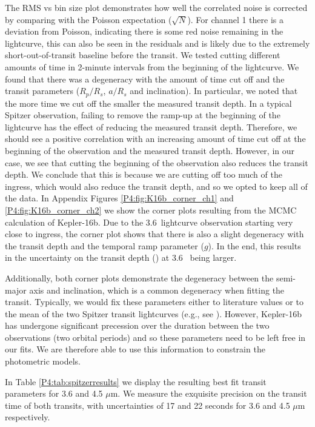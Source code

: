 The RMS vs bin size plot demonstrates how well the correlated noise is corrected by comparing with the Poisson expectation ($\sqrt{N}$). For channel 1 there is a deviation from Poisson, indicating there is some red noise remaining in the lightcurve, this can also be seen in the residuals and is likely due to the extremely short-out-of-transit baseline before the transit. We tested cutting different amounts of time in 2-minute intervals from the beginning of the lightcurve. We found that there was a degeneracy with the amount of time cut off and the transit parameters ($R_p/R_s$, $a/R_s$ and inclination). In particular, we noted that the more time we cut off the smaller the measured transit depth. In a typical Spitzer observation, failing to remove the ramp-up at the beginning of the lightcurve has the effect of reducing the measured transit depth. Therefore, we should see a positive correlation with an increasing amount of time cut off at the beginning of the observation and the measured transit depth. However, in our case, we see that cutting the beginning of the observation also reduces the transit depth. We conclude that this is because we are cutting off too much of the ingress, which would also reduce the transit depth, and so we opted to keep all of the data. In Appendix Figures \ref{P4:fig:K16b_corner_ch1} and \ref{P4:fig:K16b_corner_ch2} we show the corner plots resulting from the MCMC calculation of Kepler-16b. Due to the 3.6\um~lightcurve observation starting very close to ingress, the corner plot shows that there is also a slight degeneracy with the transit depth and the temporal ramp parameter ($g$). In the end, this results in the uncertainty on the transit depth (\rprss) at 3.6\um~ being larger.

Additionally, both corner plots demonstrate the degeneracy between the semi-major axis and inclination, which is a common degeneracy when fitting the transit. Typically, we would fix these parameters either to literature values or to the mean of the two Spitzer transit lightcurves (e.g., see \citet{Baxter2021}). However, Kepler-16b has undergone significant precession over the duration between the two observations (two orbital periods) and so these parameters need to be left free in our fits. We are therefore able to use this information to constrain the photometric models.

In Table \ref{P4:tab:spitzerresults} we display the resulting best fit transit parameters for 3.6 and 4.5 $\mu$m. We measure the exquisite precision on the transit time of both transits, with uncertainties of 17 and 22 seconds for 3.6 and 4.5 $\mu$m respectively.

